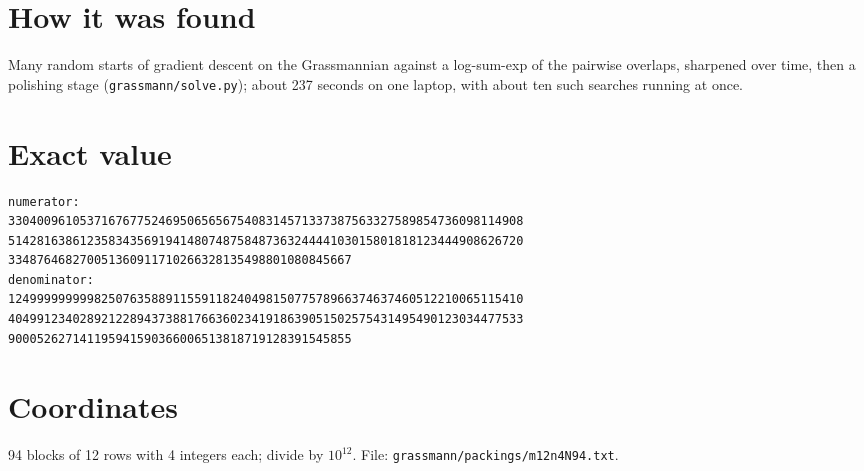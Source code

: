 \documentclass[11pt,a4paper]{article}
\begin{document}
\section{How it was found}
Many random starts of gradient descent on the Grassmannian against a log-sum-exp of the pairwise overlaps, sharpened over time, then a polishing stage (\texttt{grassmann/solve.py}); about 237 seconds on one laptop, with about ten such searches running at once.


\appendix
\section{Exact value}
{\small
\begin{verbatim}
numerator:
330400961053716767752469506565675408314571337387563327589854736098114908
514281638612358343569194148074875848736324444103015801818123444908626720
334876468270051360911710266328135498801080845667
denominator:
124999999999825076358891155911824049815077578966374637460512210065115410
404991234028921228943738817663602341918639051502575431495490123034477533
900052627141195941590366006513818719128391545855
\end{verbatim}}

\section{Coordinates}
94 blocks of 12 rows with 4 integers each; divide by $10^{12}$. File: \texttt{grassmann/packings/m12n4N94.txt}.
{\tiny
\begin{multicols}{3}
\end{multicols}}
\end{document}
